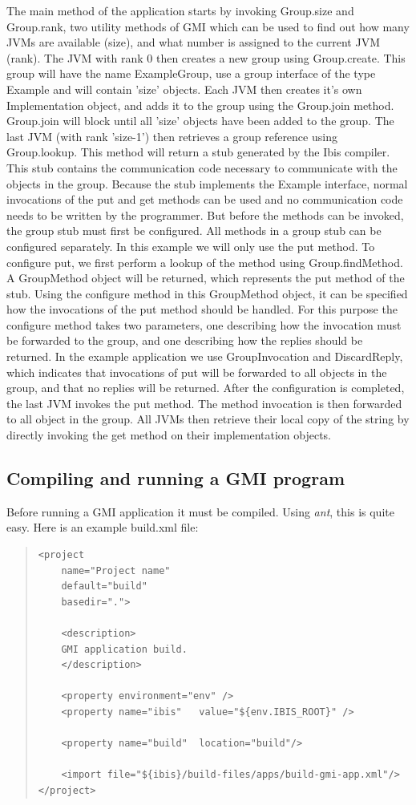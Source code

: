 \documentclass[10pt]{article}
\newcommand{\mysubsection}[1]{\subsection{#1}\label{#1}}
\begin{document}
The main method of the application starts by invoking Group.size and
Group.rank, two utility methods of GMI which can be used to find out
how many JVMs are available (size), and what number is assigned to the
current JVM (rank).  The JVM with rank 0 then creates a new group
using Group.create. This group will have the name ExampleGroup, use a
group interface of the type Example and will contain 'size'
objects. Each JVM then creates it's own Implementation object, and
adds it to the group using the Group.join method. Group.join will
block until all 'size' objects have been added to the group.  The last
JVM (with rank 'size-1') then retrieves a group reference using
Group.lookup. This method will return a stub generated by the Ibis
compiler. This stub contains the communication code necessary to
communicate with the objects in the group. Because the stub implements
the Example interface, normal invocations of the put and get methods
can be used and no communication code needs to be written by the
programmer. But before the methods can be invoked, the group stub must
first be configured.  All methods in a group stub can be configured
separately. In this example we will only use the put method. To
configure put, we first perform a lookup of the method using
Group.findMethod. A GroupMethod object will be returned, which
represents the put method of the stub.  Using the configure method in
this GroupMethod object, it can be specified how the invocations of
the put method should be handled. For this purpose the configure
method takes two parameters, one describing how the invocation must be
forwarded to the group, and one describing how the replies should be
returned. In the example application we use GroupInvocation and
DiscardReply, which indicates that invocations of put will be
forwarded to all objects in the group, and that no replies will be
returned.  After the configuration is completed, the last JVM invokes
the put method. The method invocation is then forwarded to all object
in the group. All JVMs then retrieve their local copy of the string by
directly invoking the get method on their implementation objects.


\mysubsection{Compiling and running a GMI program}

Before running a GMI application it must be compiled.
Using \emph{ant}, this is quite easy. Here is an example build.xml file:

{\small
\begin{quote}
\begin{verbatim}
<project
    name="Project name"
    default="build"
    basedir=".">

    <description>
    GMI application build.
    </description>

    <property environment="env" />
    <property name="ibis"   value="${env.IBIS_ROOT}" />

    <property name="build"  location="build"/>

    <import file="${ibis}/build-files/apps/build-gmi-app.xml"/>
</project>
\end{verbatim}
\end{quote}
}
\end{document}
